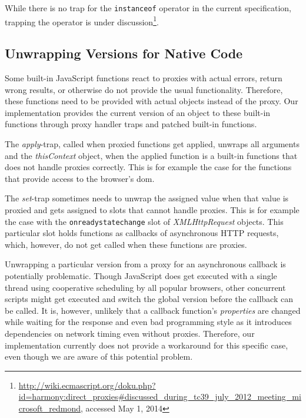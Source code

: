 While there is no trap for the \lstinline{instanceof} operator in the current specification, trapping the operator is under discussion\footnote{\url{http://wiki.ecmascript.org/doku.php?id=harmony:direct_proxies\#discussed_during_tc39_july_2012_meeting_microsoft_redmond}, accessed May 1, 2014}.


\subsection{Unwrapping Versions for Native Code} \label{subsec:IMPLEMENTATION:4.3}

Some built-in JavaScript functions react to proxies with actual errors, return wrong results, or otherwise do not provide the usual functionality.
Therefore, these functions need to be provided with actual objects instead of the proxy.
Our implementation provides the current version of an object to these built-in functions through proxy handler traps and patched built-in functions.

The \emph{apply}-trap, called when proxied functions get applied, unwraps all arguments and the \emph{thisContext} object, when the applied function is a built-in functions that does not handle proxies correctly.
This is for example the case for the functions that provide access to the browser's \ac{dom}.

The \emph{set}-trap sometimes needs to unwrap the assigned value when that value is proxied and gets assigned to slots that cannot handle proxies.
This is for example the case with the \lstinline{onreadystatechange} slot of \emph{XMLHttpRequest} objects.
This particular slot holds functions as callbacks of asynchronous HTTP requests, which, however, do not get called when these functions are proxies.

Unwrapping a particular version from a proxy for an asynchronous callback is potentially problematic.
Though JavaScript does get executed with a single thread using cooperative scheduling by all popular browsers, other concurrent scripts might get executed and switch the global version before the callback can be called.
It is, however, unlikely that a callback function's \emph{properties} are changed while waiting for the response and even bad programming style as it introduces dependencies on network timing even without proxies.
Therefore, our implementation currently does not provide a workaround for this specific case, even though we are aware of this potential problem. 

